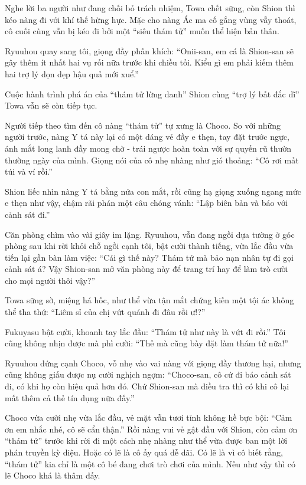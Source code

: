 \documentclass[../main.tex]{subfiles}
\begin{document}
Nghe lời ba người như đang chối bỏ trách nhiệm, Towa chết sững, còn Shion thì kéo nàng đi với khí thế hừng hực. Mặc cho nàng Ác ma cố gắng vùng vẫy thoát, cô cuối cùng vẫn bị kéo đi bởi một ``siêu thám tử'' muốn thể hiện bản thân.

Ryuuhou quay sang tôi, giọng đầy phấn khích: ``Onii-san, em cá là Shion-san sẽ gây thêm ít nhất hai vụ rối nữa trước khi chiều tối. Kiểu gì em phải kiếm thêm hai trợ lý dọn dẹp hậu quả mới xuể.''

Cuộc hành trình phá án của ``thám tử lừng danh'' Shion cùng ``trợ lý bất đắc dĩ'' Towa vẫn sẽ còn tiếp tục.

\ct

Người tiếp theo tìm đến cô nàng ``thám tử'' tự xưng là Choco. So với những người trước, nàng Y tá này lại có một dáng vẻ đầy e thẹn, tay đặt trước ngực, ánh mắt long lanh đầy mong chờ - trái ngược hoàn toàn với sự quyến rũ thườn thường ngày của mình. Giọng nói của cô nhẹ nhàng như gió thoảng: ``Cô rơi mất túi và ví rồi.''


Shion liếc nhìn nàng Y tá bằng nửa con mắt, rồi cũng hạ giọng xuống ngang mức e thẹn như vậy, chậm rãi phán một câu chóng vánh: ``Lập biên bản và báo với cảnh sát đi.''

Căn phòng chìm vào vài giây im lặng. Ryuuhou, vẫn đang ngồi dựa tường ở góc phòng sau khi rời khỏi chỗ ngồi cạnh tôi, bật cười thành tiếng, vừa lắc đầu vừa tiến lại gần bàn làm việc: ``Cái gì thế này? Thám tử mà bảo nạn nhân tự đi gọi cảnh sát á? Vậy Shion-san mở văn phòng này để trang trí hay để làm trò cười cho mọi người thôi vậy?''

Towa sững sờ, miệng há hốc, như thể vừa tận mắt chứng kiến một tội ác không thể tha thứ: ``Liêm sỉ của chị vứt quánh đi đâu rồi ư!?''

Fukuyasu bật cười, khoanh tay lắc đầu: ``Thám tử như này là vứt đi rồi.'' Tôi cũng không nhịn được mà phì cười: ``Thế mà cũng bày đặt làm thám tử nữa!''

Ryuuhou đứng cạnh Choco, vỗ nhẹ vào vai nàng với giọng đầy thương hại, nhưng cũng không giấu được nụ cười nghịch ngợm: ``Choco-san, cô cứ đi báo cảnh sát đi, có khi họ còn hiệu quả hơn đó. Chứ Shion-san mà điều tra thì có khi cô lại mất thêm cả thẻ tín dụng nữa đấy.''

Choco vừa cười nhẹ vừa lắc đầu, vẻ mặt vẫn tươi tỉnh không hề bực bội: ``Cảm ơn em nhắc nhé, cô sẽ cẩn thận.'' Rồi nàng vui vẻ gật đầu với Shion, còn cảm ơn ``thám tử'' trước khi rời đi một cách nhẹ nhàng như thể vừa được ban một lời phán truyền kỳ diệu. Hoặc có lẽ là cô ấy quá dễ dãi. Có lẽ là vì cô biết rằng, ``thám tử'' kia chỉ là một cô bé đang chơi trò chơi của mình. Nếu như vậy thì có lẽ Choco khá là thâm đấy.
\end{document}
